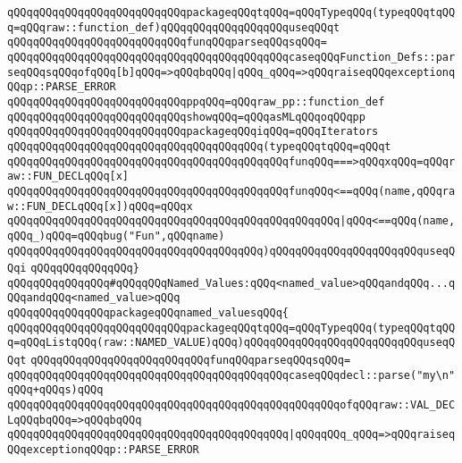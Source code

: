\verb|qQQqqQQqqQQqqQQqqQQqqQQqqQQqpackageqQQqtqQQq=qQQqTypeqQQq(typeqQQqtqQQq=qQQqraw::function_def)qQQqqQQqqQQqqQQqqQQquseqQQqt|\newline
\verb|qQQqqQQqqQQqqQQqqQQqqQQqqQQqfunqQQqparseqQQqsqQQq=|\newline
\verb|qQQqqQQqqQQqqQQqqQQqqQQqqQQqqQQqqQQqqQQqqQQqcaseqQQqFunction_Defs::parseqQQqsqQQqofqQQq[b]qQQq=>qQQqbqQQq|\verb#|qQQq_qQQq=>qQQqraiseqQQqexceptionqQQqp::PARSE_ERROR#\newline
\verb|qQQqqQQqqQQqqQQqqQQqqQQqqQQqppqQQq=qQQqraw_pp::function_def|\newline
\verb|qQQqqQQqqQQqqQQqqQQqqQQqqQQqshowqQQq=qQQqasMLqQQqoqQQqpp|\newline
\verb|qQQqqQQqqQQqqQQqqQQqqQQqqQQqpackageqQQqiqQQq=qQQqIterators|\newline
\verb|qQQqqQQqqQQqqQQqqQQqqQQqqQQqqQQqqQQqqQQq(typeqQQqtqQQq=qQQqt|\newline
\verb|qQQqqQQqqQQqqQQqqQQqqQQqqQQqqQQqqQQqqQQqqQQqfunqQQq===>qQQqxqQQq=qQQqraw::FUN_DECLqQQq[x]|\newline
\verb|qQQqqQQqqQQqqQQqqQQqqQQqqQQqqQQqqQQqqQQqqQQqfunqQQq<==qQQq(name,qQQqraw::FUN_DECLqQQq[x])qQQq=qQQqx|\newline
\verb|qQQqqQQqqQQqqQQqqQQqqQQqqQQqqQQqqQQqqQQqqQQqqQQqqQQq|\verb#|qQQq<==qQQq(name,qQQq_)qQQq=qQQqbug("Fun",qQQqname)#\newline
\verb|qQQqqQQqqQQqqQQqqQQqqQQqqQQqqQQqqQQqqQQq)qQQqqQQqqQQqqQQqqQQqqQQquseqQQqi|\newline
\verb|qQQqqQQqqQQqqQQq}|\newline
\newline
\verb|qQQqqQQqqQQqqQQq#qQQqqQQqNamed_Values:qQQq<named_value>qQQqandqQQq...qQQqandqQQq<named_value>qQQq|\newline
\verb|qQQqqQQqqQQqqQQqpackageqQQqnamed_valuesqQQq{|\newline
\newline
\verb|qQQqqQQqqQQqqQQqqQQqqQQqqQQqpackageqQQqtqQQq=qQQqTypeqQQq(typeqQQqtqQQq=qQQqListqQQq(raw::NAMED_VALUE)qQQq)qQQqqQQqqQQqqQQqqQQqqQQqqQQquseqQQqt|\newline
\verb|qQQqqQQqqQQqqQQqqQQqqQQqqQQqfunqQQqparseqQQqsqQQq=|\newline
\verb|qQQqqQQqqQQqqQQqqQQqqQQqqQQqqQQqqQQqqQQqqQQqcaseqQQqdecl::parse("my\n"qQQq+qQQqs)qQQq|\newline
\verb|qQQqqQQqqQQqqQQqqQQqqQQqqQQqqQQqqQQqqQQqqQQqqQQqqQQqofqQQqraw::VAL_DECLqQQqbqQQq=>qQQqbqQQq|\newline
\verb|qQQqqQQqqQQqqQQqqQQqqQQqqQQqqQQqqQQqqQQqqQQq|\verb#|qQQqqQQq_qQQq=>qQQqraiseqQQqexceptionqQQqp::PARSE_ERROR#\newline
